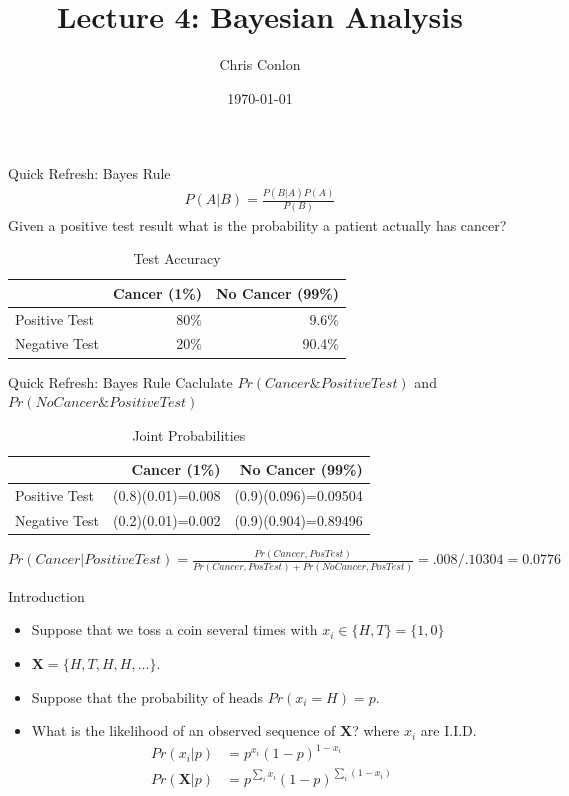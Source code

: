 \documentclass[aspectratio=169]{beamer}
\title{Lecture 4: Bayesian Analysis}
\author{Chris Conlon }
\institute{NYU Stern }
\date{\today}
\begin{document}
\maketitle


\begin{frame}{Quick Refresh: Bayes Rule}
\begin{align*}
P(A | B)=\frac{P(B | A) P(A)}{P(B)}
\end{align*}
Given a \alert{positive test result} what is the probability a patient actually has cancer?
\begin{center}
\begin{table}[htp]
\caption{Test Accuracy}
\begin{center}
\begin{tabular}{l|r|r|}
& Cancer (1\%) & No Cancer (99\%) \\ \toprule
Positive Test& 80\% & 9.6\% \\
Negative Test& 20\% & 90.4\%
\end{tabular}
\end{center}
\end{table}%
\end{center}
\end{frame}


\begin{frame}{Quick Refresh: Bayes Rule}
Caclulate $Pr(Cancer \& Positive Test)$ and $Pr(No Cancer \& Positive Test)$
\begin{center}
\begin{table}[htp]
\caption{Joint Probabilities}
\begin{center}
\begin{tabular}{l|r|r|}
& Cancer (1\%) & No Cancer (99\%) \\ \toprule
Positive Test& (0.8)(0.01)=0.008 & (0.9)(0.096)=0.09504 \\
Negative Test& (0.2)(0.01)=0.002 & (0.9)(0.904)=0.89496
\end{tabular}
\end{center}
\end{table}
\end{center}
$Pr(Cancer | Positive Test) = \frac{Pr(Cancer, Pos Test)}{Pr(Cancer,Pos Test) + Pr(NoCancer, Pos Test)}= .008/.10304 = 0.0776$
\end{frame}



\begin{frame}{Introduction}
\begin{itemize}
\item Suppose that we toss a coin several times with $x_i \in \{H,T\}=\{1,0\}$ 
\item $\mathbf{X} = \{H,T,H,H,\ldots\}$.
\item Suppose that the probability of heads $Pr(x_i = H) = p$.
\item What is the likelihood of an observed sequence of $\mathbf{X}$? where $x_i$ are I.I.D.
\begin{align*}
Pr(x_i | p) &= p^{x_i} (1-p)^{1-x_i} \\
Pr(\mathbf{X} | p) &=  p^{\sum_i x_i} (1-p)^{\sum_i (1- x_i)} 
\end{align*}
\end{itemize}
\end{frame}
\end{document}
